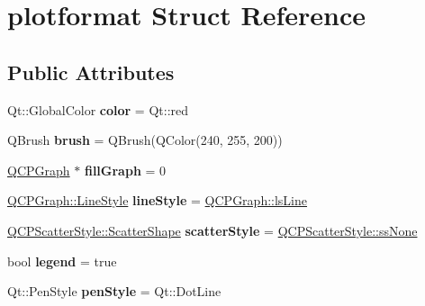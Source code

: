 \hypertarget{structplotformat}{}\section{plotformat Struct Reference}
\label{structplotformat}
\subsection*{Public Attributes}
\begin{DoxyCompactItemize}
\item 
\mbox{\label{structplotformat_a1072ed04a057a74c8788f444d1c6eea6}} 
Qt\+::\+Global\+Color {\bfseries color} = Qt\+::red
\item 
\mbox{\label{structplotformat_ae1f0c53f26b2aa3678c7c02859941d1d}} 
Q\+Brush {\bfseries brush} = Q\+Brush(Q\+Color(240, 255, 200))
\item 
\mbox{\label{structplotformat_a674e370c7a4e8693d45530273b5edd38}} 
\hyperlink{class_q_c_p_graph}{Q\+C\+P\+Graph} $\ast$ {\bfseries fill\+Graph} = 0
\item 
\mbox{\label{structplotformat_a8b09f30348f7e5411647c9ca701aa07f}} 
\hyperlink{class_q_c_p_graph_ad60175cd9b5cac937c5ee685c32c0859}{Q\+C\+P\+Graph\+::\+Line\+Style} {\bfseries line\+Style} = \hyperlink{class_q_c_p_graph_ad60175cd9b5cac937c5ee685c32c0859a3c42a27b15aa3c92d399082fad8b7515}{Q\+C\+P\+Graph\+::ls\+Line}
\item 
\mbox{\label{structplotformat_aa0a0825c37ece0e00978f9ea9e2483df}} 
\hyperlink{class_q_c_p_scatter_style_adb31525af6b680e6f1b7472e43859349}{Q\+C\+P\+Scatter\+Style\+::\+Scatter\+Shape} {\bfseries scatter\+Style} = \hyperlink{class_q_c_p_scatter_style_adb31525af6b680e6f1b7472e43859349abd144c291ca274f77053ec68cab6c022}{Q\+C\+P\+Scatter\+Style\+::ss\+None}
\item 
\mbox{\label{structplotformat_ac8a149cc3c5c827289ec04ecdd1e7600}} 
bool {\bfseries legend} = true
\item 
\mbox{\label{structplotformat_a86332367e7be7fe6c3fd25f9b322d133}} 
Qt\+::\+Pen\+Style {\bfseries pen\+Style} = Qt\+::\+Dot\+Line

\end{DoxyCompactItemize}
